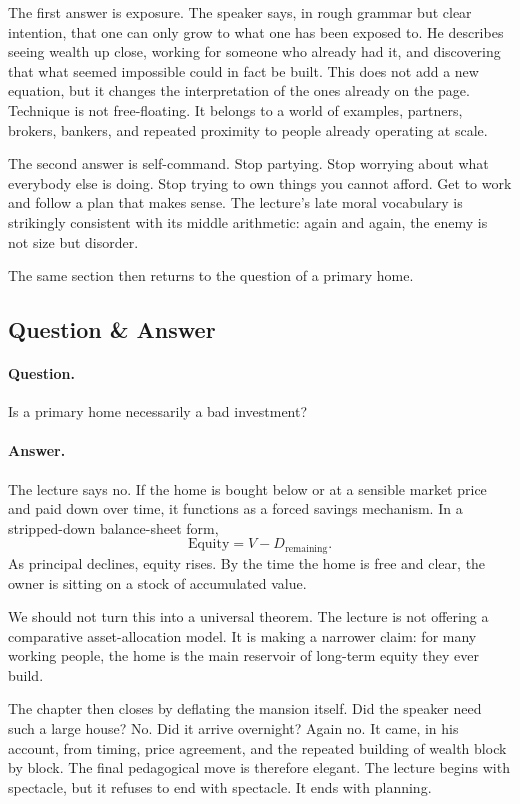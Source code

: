 The first answer is exposure. The speaker says, in rough grammar but clear intention, that one can only grow to what one has been exposed to. He describes seeing wealth up close, working for someone who already had it, and discovering that what seemed impossible could in fact be built. This does not add a new equation, but it changes the interpretation of the ones already on the page. Technique is not free-floating. It belongs to a world of examples, partners, brokers, bankers, and repeated proximity to people already operating at scale.

The second answer is self-command. Stop partying. Stop worrying about what everybody else is doing. Stop trying to own things you cannot afford. Get to work and follow a plan that makes sense. The lecture's late moral vocabulary is strikingly consistent with its middle arithmetic: again and again, the enemy is not size but disorder.

The same section then returns to the question of a primary home.

\subsection{Question \& Answer}

\paragraph{Question.} Is a primary home necessarily a bad investment?

\paragraph{Answer.} The lecture says no. If the home is bought below or at a sensible market price and paid down over time, it functions as a forced savings mechanism. In a stripped-down balance-sheet form,
\begin{equation}
\text{Equity} = V - D_{\text{remaining}}.
\end{equation}
As principal declines, equity rises. By the time the home is free and clear, the owner is sitting on a stock of accumulated value.

We should not turn this into a universal theorem. The lecture is not offering a comparative asset-allocation model. It is making a narrower claim: for many working people, the home is the main reservoir of long-term equity they ever build.

The chapter then closes by deflating the mansion itself. Did the speaker need such a large house? No. Did it arrive overnight? Again no. It came, in his account, from timing, price agreement, and the repeated building of wealth block by block. The final pedagogical move is therefore elegant. The lecture begins with spectacle, but it refuses to end with spectacle. It ends with planning.


